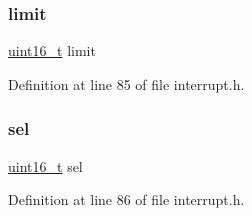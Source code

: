 \mbox{\label{a00089_ab28e82ae69032cb4ad3ec3a0be3d7129_ab28e82ae69032cb4ad3ec3a0be3d7129}} 
\subsubsection{\texorpdfstring{limit}{limit}}
{\footnotesize\ttfamily \hyperlink{a00116_a273cf69d639a59973b6019625df33e30_a273cf69d639a59973b6019625df33e30}{uint16\+\_\+t} limit}



Definition at line 85 of file interrupt.\+h.

\mbox{\label{a00089_af0b0a7e10694e3b600c7561311cc8271_af0b0a7e10694e3b600c7561311cc8271}} 
\subsubsection{\texorpdfstring{sel}{sel}}
{\footnotesize\ttfamily \hyperlink{a00116_a273cf69d639a59973b6019625df33e30_a273cf69d639a59973b6019625df33e30}{uint16\+\_\+t} sel}



Definition at line 86 of file interrupt.\+h.

